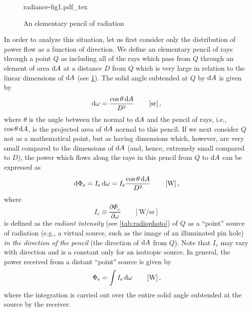 \begin{refsection}

\begin{figure}
	\begin{center}
		{radiance-fig1.pdf_tex}
	\end{center}
	\caption{An elementary pencil of radiation}
	\label{fig:nicodemus1}
\end{figure}

In order to analyze this situation, let us first consider only the distribution
of power flow as a function of direction. We define an elementary pencil of rays
through a point $Q$ as including all of the rays which pass from $Q$ through an
element of area $\mathop{}\!\mathrm{d} A$ at a distance $D$ from $Q$ which is very large in relation
to
the linear dimensions of $\mathop{}\!\mathrm{d} A$ (see \cref{fig:nicodemus1}).
The solid angle subtended at $Q$ by $\mathop{}\!\mathrm{d} A$ is given by
\begin{equation*}
\d\omega = \frac{\cos\theta \d A}{D^2}
\qquad \left[\unit{\steradian}\right],
\end{equation*}
where $\theta$ is the angle between the normal to $\mathop{}\!\mathrm{d} A$ and the pencil of rays,
i.e., $\cos\theta \mathop{}\!\mathrm{d} A$, is the projected area of $\mathop{}\!\mathrm{d} A$ normal to this pencil.
If we next consider $Q$ not as a mathematical point, but as having dimensions
which, however, are very small compared to the dimensions of $\mathop{}\!\mathrm{d} A$ (and, hence,
extremely small compared to $D$), the power which flows along the rays in this
pencil from $Q$ to $\mathop{}\!\mathrm{d} A$ can be expressed as
\begin{equation*}
\d\Phi_e = I_e \d\omega = I_e \frac{\cos\theta \d A}{D^2}
\qquad \left[\unit{\watt}\right],
\end{equation*}
where
\begin{equation}
I_e \equiv \frac{\partial \Phi_e}{\partial \omega}
\qquad \left[\unit{\watt\per\steradian}\right]
\end{equation}
is defined as the \textsl{radiant intensity} (see \cref{tab:radiophoto}) of
$Q$ as a “point” source of radiation (e.g., a virtual source, such as the image
of an illuminated pin hole) \emph{in the direction of the pencil} (the direction of
$\mathop{}\!\mathrm{d} A$ from $Q$). Note that $I_e$ may vary with direction and is a constant only
for an isotropic source. In general, the power received from a distant “point"
source is given by
\begin{equation}
\Phi_e = \int I_e \d\omega
\qquad \left[\unit{\watt}\right],
\end{equation}
where the integration is carried out over the entire solid angle subtended at
the source by the receiver.


\end{refsection}

